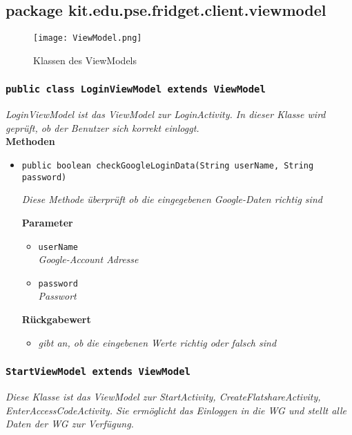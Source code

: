 		\subsection{package kit.edu.pse.fridget.client.viewmodel}
		\begin{figure}[H]
	       \centering
	       \texttt{[image: ViewModel.png]}
	       \caption{Klassen des ViewModels}
	      \end{figure}
      
		\subsubsection{\texttt{public class LoginViewModel extends ViewModel}}
        \textit{LoginViewModel ist das ViewModel zur LoginActivity. In dieser Klasse wird geprüft, ob der Benutzer sich korrekt einloggt.}\\
        
		\textbf{Methoden}
 			\begin{itemize}
        		\item{\texttt{public boolean checkGoogleLoginData(String userName, String password)}}
        	
        		\textit{Diese Methode überprüft ob die eingegebenen Google-Daten richtig sind}
        	
        		\textbf{Parameter}
        		\begin{itemize}
        			\item\texttt{userName}\\ 
        			\textit{Google-Account Adresse}
        			\item\texttt{password}\\ 
        			\textit{Passwort}
        		\end{itemize}

				\textbf{Rückgabewert}
				\begin{itemize} 
					\item\textit{gibt an, ob die eingebenen Werte richtig oder falsch sind}
				\end{itemize}
			
			\end{itemize}
   
   
       \subsubsection{\texttt{StartViewModel extends ViewModel}}
        \textit{Diese Klasse ist das ViewModel zur StartActivity, CreateFlatshareActivity, EnterAccessCodeActivity. Sie ermöglicht das Einloggen in die WG und stellt alle Daten der WG zur Verfügung.}\\
        
